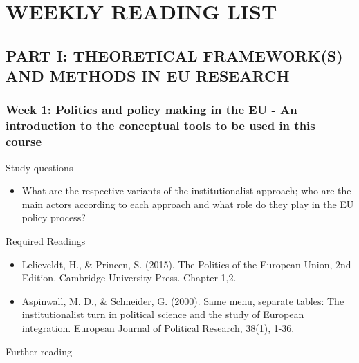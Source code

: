 \section*{WEEKLY READING LIST}

\subsection*{PART I: THEORETICAL FRAMEWORK(S) AND METHODS IN EU RESEARCH}

\subsubsection*{Week 1: Politics and policy making in the EU - An introduction to the conceptual tools to be used in this course}

Study questions

\begin{itemize}
	\item What are the respective variants of the institutionalist approach; who are the main actors according to each approach and what role do they play in the EU policy process? 
\end{itemize}

\noindent Required Readings

\begin{itemize}
	\item Lelieveldt, H., \& Princen, S. (2015). The Politics of the European Union, 2nd Edition. Cambridge University Press. Chapter 1,2.
	\item Aspinwall, M. D., \& Schneider, G. (2000). Same menu, separate tables: The institutionalist turn in political science and the study of European integration. European Journal of Political Research, 38(1), 1-36.
\end{itemize}

\noindent Further reading


